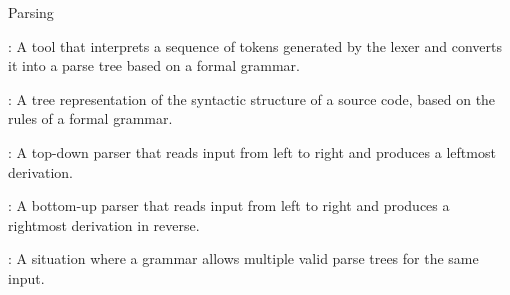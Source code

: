 \documentclass[hidelinks]{article}
\begin{document}
\begin{smodule}[title={Parsing}]{Parsing}

    \begin{sdefinition}[for=Parser]
        : A tool that interprets a sequence of tokens generated by the lexer and converts it into a parse tree based on a formal grammar.
    \end{sdefinition}

    \begin{sdefinition}[for=ParseTree]
        : A tree representation of the syntactic structure of a source code, based on the rules of a formal grammar.
    \end{sdefinition}

    \begin{sdefinition}[for=LLParser]
        : A top-down parser that reads input from left to right and produces a leftmost derivation.
    \end{sdefinition}

    \begin{sdefinition}[for=LRParser]
        : A bottom-up parser that reads input from left to right and produces a rightmost derivation in reverse.
    \end{sdefinition}

    \begin{sdefinition}[for=Ambiguity]
        : A situation where a grammar allows multiple valid parse trees for the same input.
    \end{sdefinition}

\end{smodule}
\end{document}
